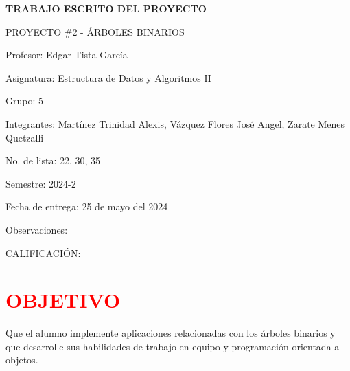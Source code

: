 \documentclass[12pt]{article}
\newcommand{\Profesor}{Profesor: Edgar Tista García}
\newcommand{\Materia}{Asignatura: Estructura de Datos y Algoritmos II}
\newcommand{\Grupo}{Grupo:  5}
\newcommand{\Nombre}{Integrantes: Martínez Trinidad Alexis, Vázquez Flores José Angel, Zarate Menes Quetzalli}
\newcommand{\NoLista}{No. de lista: 22, 30, 35}
\newcommand{\Proyecto}{PROYECTO \#2 - ÁRBOLES BINARIOS }
\newcommand{\Semestre}{Semestre: 2024-2}
\newcommand{\Fecha}{Fecha de entrega: 25 de mayo del 2024}
\newcommand{\Observaciones}{Observaciones:}
\newcommand{\Calificacion}{CALIFICACIÓN:}
\newcommand{\TituloP}{TRABAJO ESCRITO DEL PROYECTO }
\begin{document}
\begin{center}
    \LARGE\textbf{\TituloP}\par\vspace{0.7cm}
\end{center}
\Large{\Proyecto}\par\vspace{0.6cm}
\Large{\Profesor}\par\vspace{0.6cm}
\Large{\Materia}\par\vspace{0.6cm}
\Large{\Grupo}\par\vspace{0.6cm}
\Large{\Nombre}\par\vspace{0.6cm}
\Large{\NoLista}\par\vspace{0.6cm}
\Large{\Semestre}\par\vspace{0.6cm}
\Large{\Fecha}\par\vspace{0.6cm}
\Large{\Observaciones}\par\vspace{0.6cm}

\begin{center}
    \Large{\Calificacion}\par\vspace{0.6cm}
\end{center}

\newpage
\section*{\textcolor{red}{\textbf{OBJETIVO}}}
\par\vspace{0.4cm}
Que el alumno implemente aplicaciones relacionadas con los árboles binarios y que desarrolle sus habilidades de trabajo en equipo y programación orientada a objetos. 
\par\vspace{1.5cm}
\end{document}
